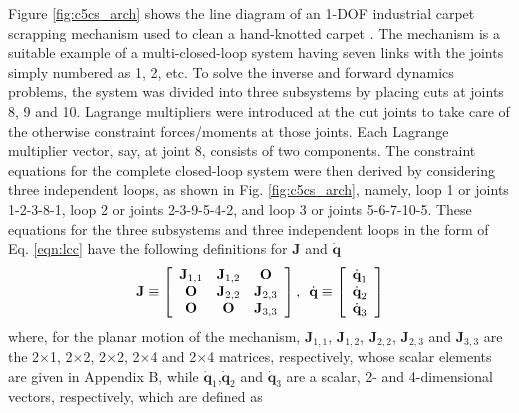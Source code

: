 {Figure \ref{fig:c5cs_arch} shows the line diagram of an 1-DOF industrial carpet scrapping mechanism used to clean a hand-knotted carpet \citep{chaudhary2008dynamics}. The mechanism is a suitable example of a multi-closed-loop system having seven links with the joints simply numbered as 1, 2, etc. To solve the inverse and forward dynamics problems, the system was divided into three subsystems by placing cuts at joints 8, 9 and 10. Lagrange multipliers were introduced at the cut joints to take care of the otherwise constraint forces/moments at those joints. Each Lagrange multiplier vector, say, at joint 8, consists of two components. The constraint equations for the complete closed-loop system were then derived by considering three independent loops, as shown in Fig. \ref{fig:c5cs_arch}, namely, loop 1 or joints 1-2-3-8-1, loop 2 or joints 2-3-9-5-4-2, and loop 3 or joints 5-6-7-10-5. These equations for the three subsystems and three independent loops in the form of Eq. \ref{eqn:lcc} have the following definitions for \textbf{J} and $\dot{\textbf{q}}$ 
	\begin{equation}
	\label{eqn:c5_Janddotq_cs}
	\textbf{J} \equiv
	\left[ \begin{array}{ccc}
	\textbf{J$_{1,1}$} & \textbf{J$_{1,2}$} & \textbf{O} \\
	\textbf{O} & \textbf{J$_{2,2}$} & \textbf{J$_{2,3}$} \\
	\textbf{O} & \textbf{O} & \textbf{J$_{3,3}$} \\ 
	\end{array} \right], \hspace*{5pt}
	\dot{\textbf{q}} \equiv 
	\left[ \begin{array}{c}
	\textbf{$\dot{\textbf{q}}_1$}\\
	\textbf{$\dot{\textbf{q}}_2$}\\
	\textbf{$\dot{\textbf{q}}_3$}\\ 
	\end{array} \right]
	\end{equation}
where, for the planar motion of the mechanism, \textbf{J$_{1,1}$}, \textbf{J$_{1,2}$}, \textbf{J$_{2,2}$}, \textbf{J$_{2,3}$} and \textbf{J$_{3,3}$} are the 2$\times$1, 2$\times$2, 2$\times$2, 2$\times$4 and 2$\times$4 matrices, respectively, whose scalar elements are given in Appendix B, while \textbf{$\dot{\textbf{q}}_1$},\textbf{$\dot{\textbf{q}}_2$} and \textbf{$\dot{\textbf{q}}_3$} are a scalar, 2- and 4-dimensional vectors, respectively, which are defined as 
	\begin{equation}
	\label{eqn:jointrates_cs}

\end{equation}}
